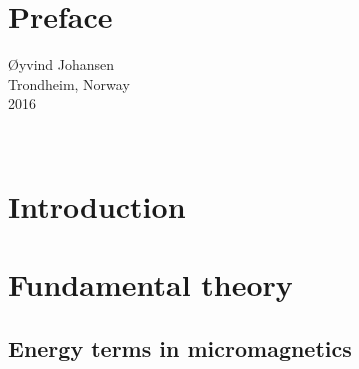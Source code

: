 \documentclass[12pt, a4paper, twoside, openright]{report}
\renewcommand{\d}[1]{\ensuremath{\operatorname{d}\!{#1}}}
\numberwithin{equation}{chapter}
\numberwithin{figure}{chapter}
\numberwithin{table}{chapter}
\begin{document}
\chapter*{Preface}

\begin{minipage}{0.95\textwidth}
\begin{flushright}
\O yvind Johansen \\
Trondheim, Norway \\ 
2016
\end{flushright}
\end{minipage}\\[4cm]

\newpage

\tableofcontents

\newpage


\chapter{Introduction}

\chapter{Fundamental theory}
\section{Energy terms in micromagnetics}
\end{document}
